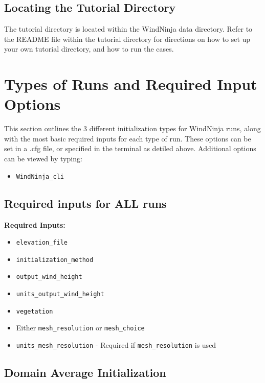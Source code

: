 \documentclass[12pt]{article}
\begin{document}
\subsection*{   Locating the Tutorial Directory}
The tutorial directory is located within the WindNinja data directory. Refer to the README file within the tutorial directory for directions on how to set up your own tutorial directory, and how to run the cases.  


\section*{Types of Runs and Required Input Options}

This section outlines the 3 different initialization types for WindNinja runs, along with the most basic required inputs for each type of run. These options can be set in a .cfg file, or specified in the terminal as detiled above. Additional options can be viewed by typing: 
\begin{itemize}
\item[]\texttt{WindNinja\_cli} 
\end{itemize}



\subsection*{Required inputs for ALL runs}

\textbf{Required Inputs:}
\begin{itemize}
    \item \texttt{elevation\_file}
    \item \texttt{initialization\_method}
    \item \texttt{output\_wind\_height}
    \item \texttt{units\_output\_wind\_height}
    \item \texttt{vegetation}
    \item Either \texttt{mesh\_resolution} or \texttt{mesh\_choice}
    \item \texttt{units\_mesh\_resolution} - Required if \texttt{mesh\_resolution} is used
\end{itemize}




\subsection*{Domain Average Initialization}
\end{document}
